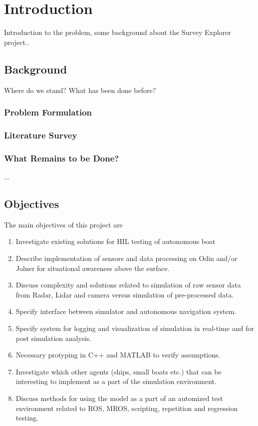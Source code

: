 \chapter{Introduction}
Introduction to the problem, some background about the Survey Explorer project..

\section{Background}
Where do we stand? What has been done before?
\subsection*{Problem Formulation}

\subsection*{Literature Survey}

\subsection*{What Remains to be Done?}
...
\section{Objectives}
The main objectives of this project are
\begin{enumerate}
\item Investigate existing solutions for HIL testing of autonomous boat
\item Describe implementation of sensors and data processing on Odin and/or Jolner for situational awareness above the surface.
\item Discuss complexity and solutions related to simulation of raw sensor data from Radar, Lidar and camera versus simulation of pre-processed data.  
\item Specify interface between simulator and autonomous navigation system.
\item Specify system for logging and visualization of simulation in real-time and for post simulation analysis.
\item Necessary protyping in C++ and MATLAB to verify assumptions.
\item Investigate which other agents (ships, small boats etc.) that can be interesting to implement as a part of the simulation environment.
\item Discuss methods for using the model as a part of an automized test environment related to ROS, MROS, scripting, repetition and regression testing.
\end{enumerate}

